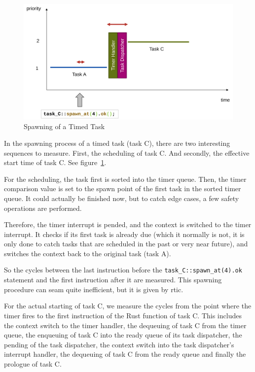 \begin{figure}
  \centerfloat
  \includegraphics[width=\textwidth]{fig/spawn_prio_timed.svg.pdf}
  \caption{Spawning of a Timed Task}%
  \label{fig:spawn_prio_timed}
\end{figure}

In the spawning process of a timed task (task C), there are two interesting sequences to measure. First, the scheduling of task C. And secondly, the effective start time of task C. See figure~\ref{fig:spawn_prio_timed}.

For the scheduling, the task first is sorted into the timer queue. Then, the timer comparison value is set to the spawn point of the first task in the sorted timer queue. It could actually be finished now, but to catch edge cases, a few safety operations are performed.

Therefore, the timer interrupt is pended, and the context is switched to the timer interrupt. It checks if its first task is already due (which it normally is not, it is only done to catch tasks that are scheduled in the past or very near future), and switches the context back to the original task (task A).

So the cycles between the last instruction before the \texttt{task_C::spawn_at(4).ok} statement and the first instruction after it are measured. This spawning procedure can seam quite inefficient, but it is given by \gls{rtic}.

For the actual starting of task C, we measure the cycles from the point where the timer fires to the first instruction of the Rust function of task C.
This includes the context switch to the timer handler, the dequeuing of task C from the timer queue, the enqueuing of task C into the ready queue of its task dispatcher, the pending of the task dispatcher, the context switch into the task dispatcher's interrupt handler, the dequeuing of task C from the ready queue and finally the prologue of task C.

